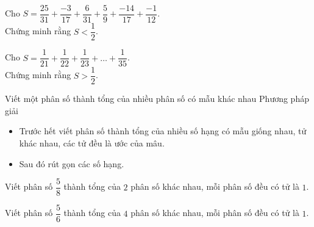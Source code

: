 \begin{vd}%
	Cho $S=\dfrac{25}{31}+\dfrac{-3}{17}+\dfrac{6}{31}+\dfrac{5}{9}+\dfrac{-14}{17}+\dfrac{-1}{12}$. \\
	Chứng minh rằng $S<\dfrac{1}{2}$.
\end{vd}

\begin{vd}%
	Cho $S=\dfrac{1}{21}+\dfrac{1}{22}+\dfrac{1}{23}+\ldots +\dfrac{1}{35}$.\\
	Chứng minh rằng $S>\dfrac{1}{2}$.
\end{vd}

\begin{dang}
	{Viết một phân số thành tổng của nhiều phân số có mẫu khác nhau}
	Phương pháp giải
	\begin{itemize}
		\item Trước hết viết phân số thành tổng của nhiều số hạng có mẫu giống nhau, tử khác nhau, các tử đều là ước của mâu.
		\item Sau đó rút gọn các số hạng.
	\end{itemize}
\end{dang}
	
\begin{vd}%
	Viết phân số $\dfrac{5}{8}$ thành tổng của $2$ phân số khác nhau, mỗi phân số đều có tử là $1$.
\end{vd}
\begin{vd}%
	Viết phân số $\dfrac{5}{6}$ thành tổng của $4$ phân số khác nhau, mỗi phân số đều có tử là $1$.
\end{vd}

